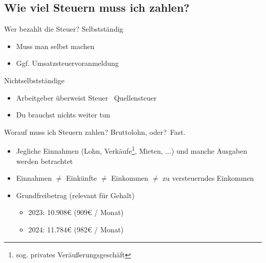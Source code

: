 \documentclass{beamer}
\begin{document}
		\subsection{Wie viel Steuern muss ich zahlen?}
			
			\begin{frame}{Wer bezahlt die Steuer?}
				Selbstständig
				\begin{itemize}
					\item Muss man selbst machen
					\item Ggf. Umsatzsteuervoranmeldung
				\end{itemize}
				\pause
				Nichtselbstständige
				\begin{itemize}
					\item Arbeitgeber überweist Steuer \textrightarrow\ Quellensteuer
					\item Du brauchst nichts weiter tun
				\end{itemize}
			\end{frame}
			
			\begin{frame}{Worauf muss ich Steuern zahlen?}
				Bruttolohn, oder?\pause\ Fast.
				\pause
				\begin{itemize}
					\item Jegliche Einnahmen (Lohn, Verkäufe\footnote{sog. privates Veräußerungsgeschäft}, Mieten, ...) und manche Ausgaben werden betrachtet
					\item Einnahmen $\neq$ Einkünfte $\neq$ Einkommen $\neq$ zu versteuerndes Einkommen\pause
					\item Grundfreibetrag (relevant für Gehalt)
					\begin{itemize}
						\item 2023: 10.908€ (909€ / Monat)
						\item 2024: 11.784€ (982€ / Monat)
					\end{itemize}
				\end{itemize}
			\end{frame}
			
\end{document}
